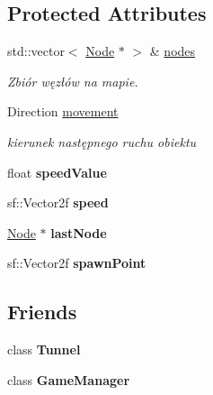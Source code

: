 \subsection*{Protected Attributes}
\begin{DoxyCompactItemize}
\item 
\mbox{\label{classDynamicObject_af5b2bd3854bed73057d1e13fd23a138e}} 
std\+::vector$<$ \hyperlink{classNode}{Node} $\ast$ $>$ \& \hyperlink{classDynamicObject_af5b2bd3854bed73057d1e13fd23a138e}{nodes}
\begin{DoxyCompactList}\small\item\em Zbiór węzłów na mapie. \end{DoxyCompactList}\item 
\mbox{\label{classDynamicObject_a97ec96a61e89872abd56017739638ca0}} 
Direction \hyperlink{classDynamicObject_a97ec96a61e89872abd56017739638ca0}{movement}
\begin{DoxyCompactList}\small\item\em kierunek następnego ruchu obiektu \end{DoxyCompactList}\item 
\mbox{\label{classDynamicObject_aa6a2b1fc0fdfae2ea1b6612638dec4af}} 
float {\bfseries speed\+Value}
\item 
\mbox{\label{classDynamicObject_adeb1429f88acc030da655f902e300eda}} 
sf\+::\+Vector2f {\bfseries speed}
\item 
\mbox{\label{classDynamicObject_a777c530472f9ce9d76e3b77c4ce0a8a7}} 
\hyperlink{classNode}{Node} $\ast$ {\bfseries last\+Node}
\item 
\mbox{\label{classDynamicObject_a21a010faebd39dffd380d72398db8521}} 
sf\+::\+Vector2f {\bfseries spawn\+Point}
\end{DoxyCompactItemize}
\subsection*{Friends}
\begin{DoxyCompactItemize}
\item 
\mbox{\label{classDynamicObject_a8ec4a0482122250d43ff5a0eecc335c8}} 
class {\bfseries Tunnel}
\item 
\mbox{\label{classDynamicObject_a140a2a29511147897abbb772733f6c2c}} 
class {\bfseries Game\+Manager}
\end{DoxyCompactItemize}


